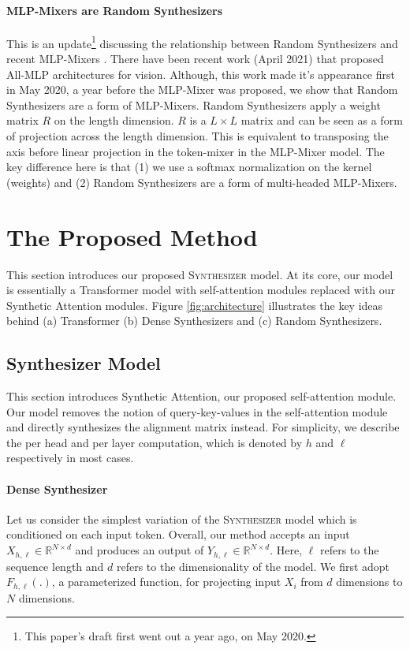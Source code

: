 \paragraph{MLP-Mixers are Random Synthesizers} This is an update\footnote{This paper's draft first went out a year ago, on May 2020.} discussing the relationship between Random Synthesizers and recent MLP-Mixers \citep{tolstikhin2021mlp}. There have been recent work (April 2021) that proposed All-MLP architectures for vision. Although, this work made it's appearance first in May 2020, a year before the MLP-Mixer was proposed, we show that Random Synthesizers are a form of MLP-Mixers. Random Synthesizers apply a weight matrix $R$ on the length dimension. $R$ is a $L \times L$ matrix and can be seen as a form of projection across the length dimension. This is equivalent to transposing the axis before linear projection in the token-mixer in the MLP-Mixer model. The key difference here is that (1) we use a softmax normalization on the kernel (weights) and (2) Random Synthesizers are a form of multi-headed MLP-Mixers.

\section{The Proposed Method} This section introduces our proposed \textsc{Synthesizer} model. At its core, our model is essentially a Transformer model with self-attention modules replaced with our Synthetic Attention modules. Figure \ref{fig:architecture} illustrates the key ideas behind (a) Transformer (b) Dense Synthesizers and (c) Random Synthesizers.

\subsection{Synthesizer Model} This section introduces Synthetic Attention, our proposed self-attention module. Our model removes the notion of query-key-values in the self-attention module and directly synthesizes the alignment matrix instead. For simplicity, we describe the per head and per layer computation, which is denoted by $h$ and $\ell$ respectively in most cases.

\paragraph{Dense Synthesizer} Let us consider the simplest variation of the \textsc{Synthesizer} model which is conditioned on each input token. Overall, our method accepts an input $X_{h,\ell} \in \mathbb{R}^{N \times d}$ and produces an output of $Y_{h,\ell} \in \mathbb{R}^{N \times d}$. Here, $\ell$ refers to the sequence length and $d$ refers to the dimensionality of the model. We first adopt $F_{h,\ell}(.)$, a parameterized function, for projecting input $X_i$ from $d$ dimensions to $N$ dimensions.

